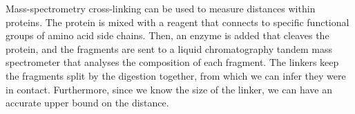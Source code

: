 Mass-spectrometry cross-linking can be used to measure distances within proteins.
The protein is mixed with a reagent that connects to specific functional groups of amino acid side chains.
Then, an enzyme is added that cleaves the protein, and the fragments are sent to a liquid chromatography tandem mass spectrometer that analyses the composition of each fragment.
The linkers keep the fragments split by the digestion together, from which we can infer they were in contact.
Furthermore, since we know the size of the linker, we can have an accurate upper bound on the distance.